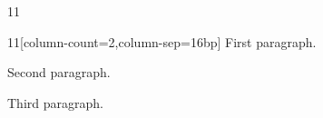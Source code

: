 \documentclass[paper=A4]{ropas-poster}
\begin{document}
\begin{postergrid}{1}{1}
\begin{posterblock}{1}{1}[column-count=2,column-sep=16bp]
First paragraph.

Second paragraph.

Third paragraph.
\end{posterblock}
\end{postergrid}
\end{document}
